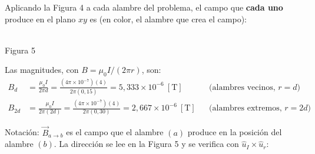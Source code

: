 \documentclass[12pt,letterpaper]{article}
\newcommand{\punto}[1]{%
  \draw[blue,line width=0.6pt] (#1) circle (0.11);
  \fill[blue] (#1) circle (0.032);}
\newcommand{\cruz}[1]{%
  \draw[blue,line width=0.6pt] (#1) circle (0.11)
        ($(#1)+(-0.078,-0.078)$)--($(#1)+(0.078,0.078)$)
        ($(#1)+(-0.078,0.078)$)--($(#1)+(0.078,-0.078)$);}
\begin{document}
\noindent Aplicando la Figura 4 a cada alambre del problema, el campo que \textbf{cada uno} produce
en el plano $xy$ es (en color, el alambre que crea el campo):

\begin{center}
\\[2pt]
{\footnotesize Figura 5}
\end{center}

\noindent Las magnitudes, con $B = \mu_0 I/(2\pi r)$, son:
\begin{align*}
    B_d    &= \frac{\mu_0 I}{2\pi d}
            = \frac{(4\pi\times10^{-7})(4)}{2\pi(0{,}15)}
            = 5{,}333\times10^{-6}\ [\text{T}]
            &&\text{(alambres vecinos, } r = d\text{)}\\[4pt]
    B_{2d} &= \frac{\mu_0 I}{2\pi (2d)}
            = \frac{(4\pi\times10^{-7})(4)}{2\pi(0{,}30)}
            = 2{,}667\times10^{-6}\ [\text{T}]
            &&\text{(alambres extremos, } r = 2d\text{)}
\end{align*}

\noindent Notaci\'on: $\vec{B}_{a\to b}$ es el campo que el alambre $(a)$ produce en la posici\'on del
alambre $(b)$. La direcci\'on se lee en la Figura 5 y se verifica con
$\hat{u}_I\times\hat{u}_r$:
\end{document}
